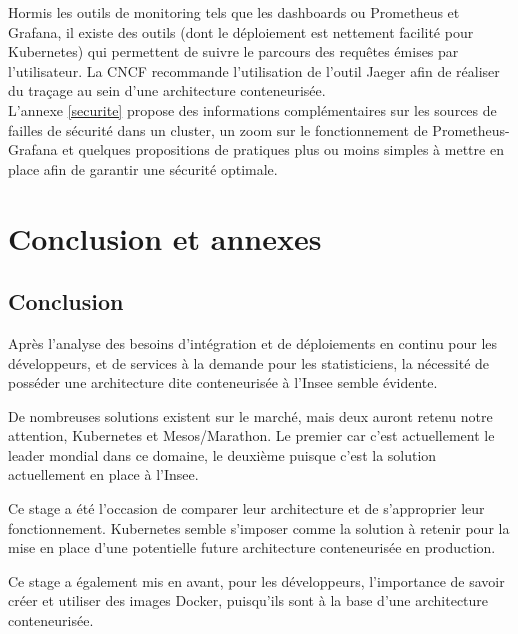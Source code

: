 \documentclass[11pt,fleqn]{book} %
\begin{document}
Hormis les outils de monitoring tels que les dashboards ou Prometheus et Grafana, il existe des outils (dont le déploiement est nettement facilité pour Kubernetes) qui permettent de suivre le parcours des requêtes émises par l’utilisateur. La CNCF recommande l’utilisation de l’outil Jaeger afin de réaliser du traçage au sein d’une architecture conteneurisée.\\

L'annexe \ref{securite} propose des informations complémentaires sur les sources de failles de sécurité dans un cluster, un zoom sur le fonctionnement de Prometheus-Grafana et quelques propositions de pratiques plus ou moins simples à mettre en place afin de garantir une sécurité optimale. 








\part{\textcolor{ocre}{Conclusion et annexes}}
\chapter{Conclusion}
\vspace{-2cm}

Après l'analyse des besoins d'intégration et de déploiements en continu pour les développeurs, et de services à la demande pour les statisticiens, la nécessité de posséder une architecture dite conteneurisée à l'Insee semble évidente. \newline

De nombreuses solutions existent sur le marché, mais deux auront retenu notre attention, Kubernetes et Mesos/Marathon. Le premier car c'est actuellement le leader mondial dans ce domaine, le deuxième puisque c'est la solution actuellement en place à l'Insee. \newline

Ce stage a été l'occasion de comparer leur architecture et de s'approprier leur fonctionnement. Kubernetes semble s'imposer comme la solution à retenir pour la mise en place d'une potentielle future architecture conteneurisée en production.\newline

Ce stage a également mis en avant, pour les développeurs, l'importance  de savoir créer et utiliser des images Docker, puisqu'ils sont à la base d'une architecture conteneurisée.\\
\end{document}
